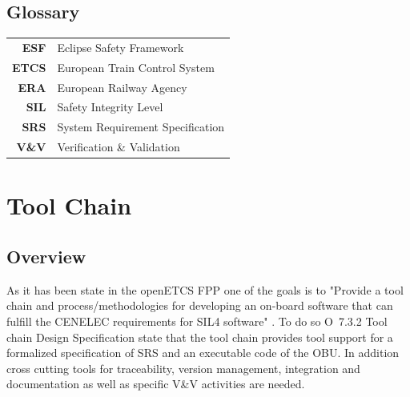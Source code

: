 \documentclass{template/openetcs_report}
\begin{document}

\section{Glossary}
\label{sec:glossary}



\begin{tabular}{rl}
\textbf{ESF} & Eclipse Safety Framework \\ 
\textbf{ETCS} & European Train Control System \\ 
\textbf{ERA} & European Railway Agency \\ 
\textbf{SIL} & Safety Integrity Level \\ 
\textbf{SRS} & System Requirement Specification \\ 
\textbf{V\&V} & Verification \& Validation \\ 
\end{tabular} 






\chapter{Tool Chain}
\label{toolchain}
\section{Overview}

As it has been state in the openETCS FPP one of the goals  is to "Provide a tool chain and process/methodologies for developing an on-board software that can fulfill the CENELEC requirements for SIL4 software" \cite{FPP}. To do so O~7.3.2 Tool chain Design Specification state that the tool chain  provides tool support for a formalized specification of SRS and an executable code of the OBU. In addition cross cutting tools for traceability, version management, integration and documentation as well as specific V\&V activities are needed.
\end{document}
